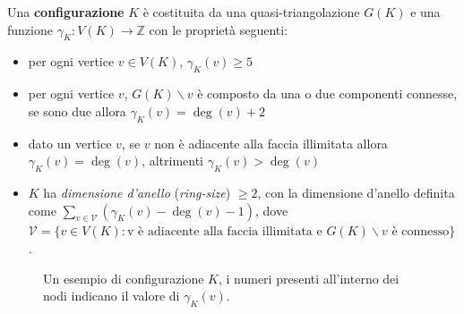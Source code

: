 \documentclass[a4paper,12pt,titlepage]{report}
\begin{document}
    \begin{dfn}
    	Una {\bfseries configurazione} $K$ è costituita da una quasi-triangolazione $G(K)$ e una funzione $\gamma_K \colon V(K) \to \mathbb{Z}$ con le proprietà seguenti:
    	\begin{itemize}
    		\item per ogni vertice $v \in V(K)$, $\gamma_K(v) \geq 5$
    		\item per ogni vertice $v$, $G(K) \smallsetminus v$ è composto da una o due componenti connesse, se sono due allora $\gamma_K(v) = \deg(v) + 2$
    		\item dato un vertice $v$, se $v$ non è adiacente alla faccia illimitata allora $\gamma_K(v) = \deg(v)$, altrimenti $\gamma_K(v) > \deg(v)$
    		\item $K$ ha \emph{dimensione d'anello} (\emph{ring-size}) $\geq 2$,
    		con la dimensione d'anello definita come $\sum_{v \in \mathcal{V}} (\gamma_K(v) - \deg(v) - 1)$, dove \\$\mathcal{V} = \{v \in V(K) : \text{v è adiacente alla faccia illimitata e } G(K) \smallsetminus v \text{ è connesso}\}$.
    	\end{itemize}
    \end{dfn}
    \begin{figure}[h]
    	\centering
        \vspace{0.5cm}
        \caption{Un esempio di configurazione $K$, i numeri presenti all'interno dei nodi indicano il valore di $\gamma_K(v)$.}
    \end{figure}
\end{document}
